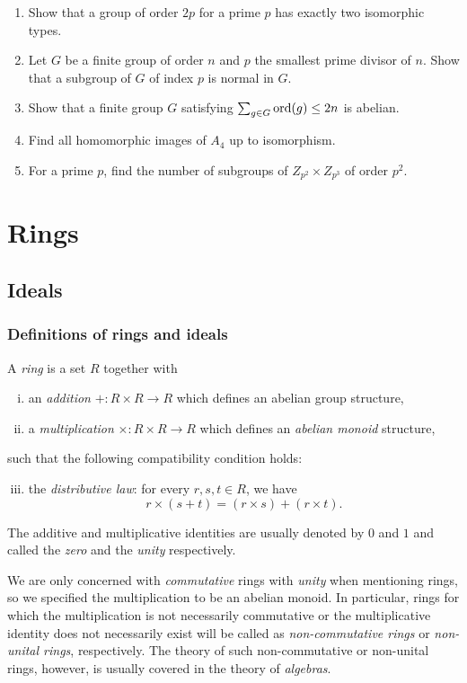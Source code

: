 \documentclass{../../large}
\begin{document}
\begin{enumerate}
\item Show that a group of order $2p$ for a prime $p$ has exactly two isomorphic types.
\item Let $G$ be a finite group of order $n$ and $p$ the smallest prime divisor of $n$. Show that a subgroup of $G$ of index $p$ is normal in $G$.
\item Show that a finite group $G$ satisfying $\sum_{g\in G}\operatorname{ord}(g)\le2n$ is abelian.
\item Find all homomorphic images of $A_4$ up to isomorphism.
\item For a prime $p$, find the number of subgroups of $Z_{p^2}\times Z_{p^3}$ of order $p^2$.
\end{enumerate}







\part{Rings}
\chapter{Ideals}
\section{Definitions of rings and ideals}
\begin{prb}
A \emph{ring} is a set $R$ together with
\begin{enumerate}[(i)]
\item an \emph{addition} $+:R\times R\to R$ which defines an abelian group structure,
\item a \emph{multiplication} $\times:R\times R\to R$ which defines an \emph{abelian monoid} structure,
\end{enumerate}
such that the following compatibility condition holds:
\begin{enumerate}[(i)]\setcounter{enumi}{2}
\item the \emph{distributive law}: for every $r,s,t\in R$, we have
\[r\times(s+t)=(r\times s)+(r\times t).\]
\end{enumerate}
The additive and multiplicative identities are usually denoted by $0$ and $1$ and called the \emph{zero} and the \emph{unity} respectively.

We are only concerned with \emph{commutative} rings with \emph{unity} when mentioning rings, so we specified the multiplication to be an abelian monoid.
In particular, rings for which the multiplication is not necessarily commutative or the multiplicative identity does not necessarily exist will be called as \emph{non-commutative rings} or \emph{non-unital rings}, respectively.
The theory of such non-commutative or non-unital rings, however, is usually covered in the theory of \emph{algebras}.
\end{prb}
\end{document}
